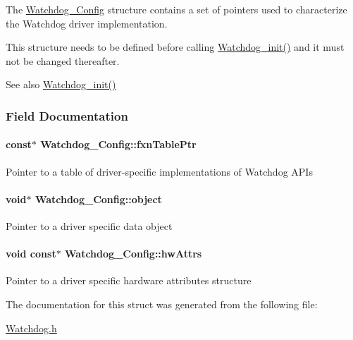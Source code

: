 The \hyperlink{struct_watchdog___config}{Watchdog\+\_\+\+Config} structure contains a set of pointers used to characterize the Watchdog driver implementation.

This structure needs to be defined before calling \hyperlink{_watchdog_8h_afaadfb59be17661ae95562f2081355e7}{Watchdog\+\_\+init()} and it must not be changed thereafter.

\begin{DoxySeeAlso}{See also}
\hyperlink{_watchdog_8h_afaadfb59be17661ae95562f2081355e7}{Watchdog\+\_\+init()} 
\end{DoxySeeAlso}


\subsubsection{Field Documentation}
\paragraph[{fxn\+Table\+Ptr}]{ const$\ast$ Watchdog\+\_\+\+Config\+::fxn\+Table\+Ptr}\label{struct_watchdog___config_a89184eb9474db817513b06dfd86bf96f}
Pointer to a table of driver-\/specific implementations of Watchdog A\+P\+Is 
\paragraph[{object}]{\setlength{\rightskip}{0pt plus 5cm}void$\ast$ Watchdog\+\_\+\+Config\+::object}\label{struct_watchdog___config_aa8602245e364f7f910255dbcb14f51d1}
Pointer to a driver specific data object 
\paragraph[{hw\+Attrs}]{\setlength{\rightskip}{0pt plus 5cm}void const$\ast$ Watchdog\+\_\+\+Config\+::hw\+Attrs}\label{struct_watchdog___config_a96131766bd4da7bc2239eed02f15bed0}
Pointer to a driver specific hardware attributes structure 

The documentation for this struct was generated from the following file\+:\begin{DoxyCompactItemize}
\item 
\hyperlink{_watchdog_8h}{Watchdog.\+h}\end{DoxyCompactItemize}
